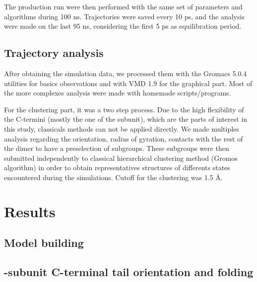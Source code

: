 \documentclass[a4paper]{article}
\begin{document}
The production run were then performed with the same set of parameters and algorithms during 100 ns. Trajectories
were saved every 10 ps, and the analysis were made on the last 95 ns, considering the first 5 ps as equilibration
period.


\subsection{Trajectory analysis}

After obtaining the simulation data, we processed them with the Gromacs 5.0.4 utilities for basics observations and
with VMD 1.9 for the graphical part. Most of the more complexes analysis were made with homemade scripts/programs.

For the clustering part, it was a two step process. Due to the high flexibility of the C-termini (mostly the one of
the \beta subunit), which are the parts of interest in this study, classicals methods can not be applied directly.
We made multiples analysis regarding the orientation, radius of gyration, contacts with the rest of the dimer to have
a preselection of subgroups. These subgroups were then submitted independently to classical hierarchical clustering
method (Gromos algorithm) in order to obtain representatives structures of differents states encountered during the
simulations. Cutoff for the clustering was 1.5 {\AA}.



\section{Results}

\subsection{Model building}


\subsection{\beta-subunit C-terminal tail orientation and folding}
\end{document}
